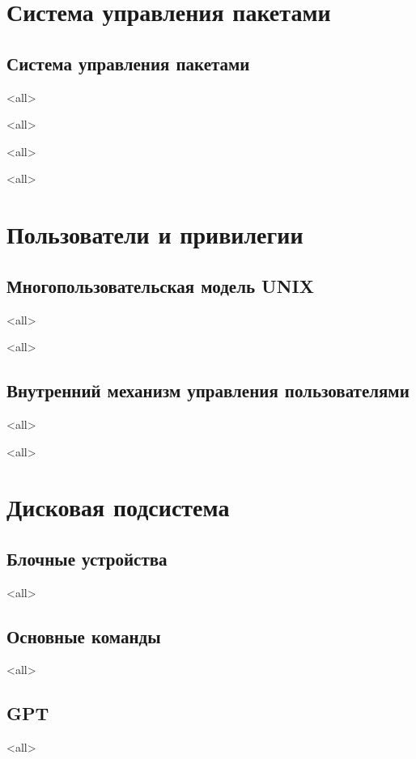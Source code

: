\chapter{Система управления пакетами}
\section{Система управления пакетами}
\mode<all>{}

\mode<all>{}

\mode<all>{}

\mode<all>{}

\chapter{Пользователи и привилегии}
\newcommand{\defaultuser}{USER}
\section{Многопользовательская модель UNIX}
\mode<all>{}

\mode<all>{}
\section{Внутренний механизм управления пользователями}
\mode<all>{}

\mode<all>{}
\let\defaultuser\undefined

\chapter{Дисковая подсистема}

\section{Блочные устройства}
\mode<all>{}
\section{Основные команды}
\mode<all>{}
\section{GPT}
\mode<all>{}
